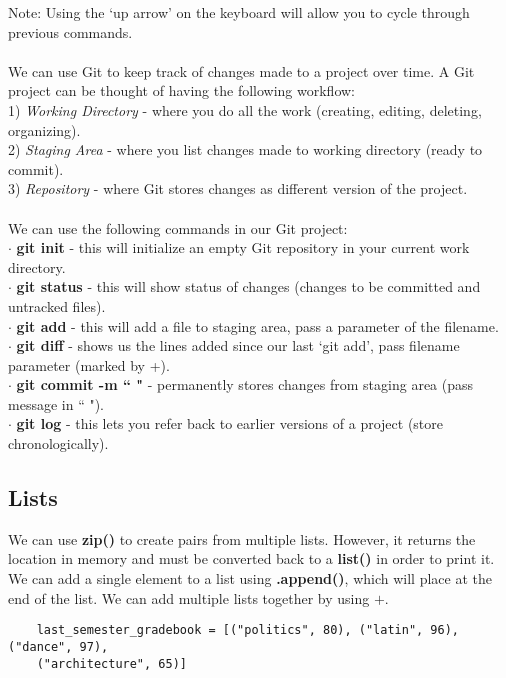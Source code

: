 \documentclass[11pt, a4paper]{article}
\begin{document}
\begin{spacing}{1.1}
	Note: Using the `up arrow' on the keyboard will allow you to cycle through previous commands. \\~\\
	We can use Git to keep track of changes made to a project over time. A Git project can be thought of having the following workflow: \vspace*{1mm} \\
	\hspace*{1.5mm} 1) \textit{Working Directory} - where you do all the work (creating, editing, deleting, organizing). \\
	\hspace*{1.5mm} 2) \textit{Staging Area} - where you list changes made to working directory (ready to commit). \\
	\hspace*{1.5mm} 3) \textit{Repository} - where Git stores changes as different version of the project. \\~\\
	We can use the following commands in our Git project: \\
	\hspace*{1.5mm} $\cdot$ \textbf{git init} - this will initialize an empty Git repository in your current work directory. \\
	\hspace*{1.5mm} $\cdot$ \textbf{git status} - this will show status of changes (changes to be committed and untracked files). \\
	\hspace*{1.5mm} $\cdot$ \textbf{git add} - this will add a file to staging area, pass a parameter of the filename. \\
	\hspace*{1.5mm} $\cdot$ \textbf{git diff} - shows us the lines added since our last `git add', pass filename parameter (marked by \textcolor{codegreen}{+}). \\
	\hspace*{1.5mm} $\cdot$ \textbf{git commit -m `` "} - permanently stores changes from staging area (pass message in `` "). \\
	\hspace*{1.5mm} $\cdot$ \textbf{git log} - this lets you refer back to earlier versions of a project (store chronologically). \\
	\subsection{Lists}
	We can use \textbf{zip()} to create pairs from multiple lists. However, it returns the location in memory and must be converted back to a \textbf{list()} in order to print it. We can add a single element to a list using \textbf{.append()}, which will place at the end of the list. We can add multiple lists together by using $\bm{+}$.
	\begin{lstlisting}
	last_semester_gradebook = [("politics", 80), ("latin", 96), ("dance", 97), 
	("architecture", 65)]
	

\end{lstlisting}
\end{spacing}
\end{document}
